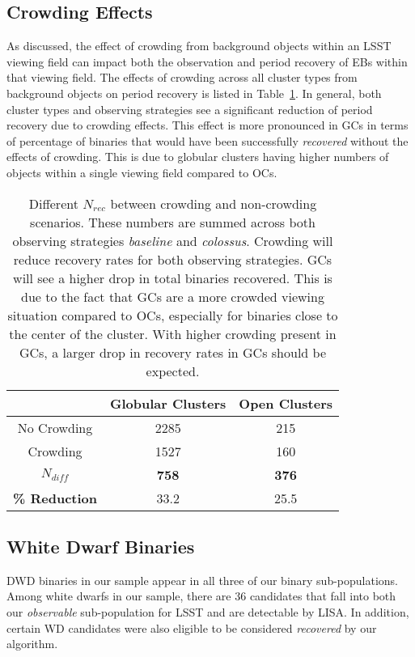 \documentclass[twocolumn]{aastex63}
\begin{document}
\subsection{Crowding Effects}
\label{subsec:crowding_results}
As discussed, the effect of crowding from background objects within an LSST viewing field can impact both the observation and period recovery of EBs within that viewing field. The effects of crowding across all cluster types from background objects on period recovery is listed in Table~\ref{tab:crowding-table-recovered}. In general, both cluster types and observing strategies see a significant reduction of period recovery due to crowding effects. This effect is more pronounced in GCs in terms of percentage of binaries that would have been successfully \textit{recovered} without the effects of crowding. This is due to globular clusters having higher numbers of objects within a single viewing field compared to OCs.
\begin{table}[]
    \centering
    \begin{tabular}{c|c|c}
        & \textbf{Globular Clusters} & \textbf{Open Clusters}  \\
        \hline 
        No Crowding & 2285 & 215 \\
        Crowding & 1527 & 160 \\
        \hline 
        $N_{diff}$ & \textbf{758} & \textbf{376} \\
        
        \textbf{\% Reduction} & 33.2 & 25.5

    \end{tabular}
    \caption{Different $N_{rec}$ between crowding and non-crowding scenarios. These numbers are summed across both observing strategies \textit{baseline} and \textit{colossus}. Crowding will reduce recovery rates for both observing strategies. GCs will see a higher drop in total binaries recovered. This is due to the fact that GCs are a more crowded viewing situation compared to OCs, especially for binaries close to the center of the cluster. With higher crowding present in GCs, a larger drop in recovery rates in GCs should be expected.}
    \label{tab:crowding-table-recovered}
\end{table}

\subsection{White Dwarf Binaries}
DWD binaries in our sample appear in all three of our binary sub-populations. Among white dwarfs in our sample, there are 36 candidates that fall into both our \textit{observable} sub-population for LSST and are detectable by LISA. In addition, certain WD candidates were also eligible to be considered \textit{recovered}  by our algorithm. 
\end{document}
